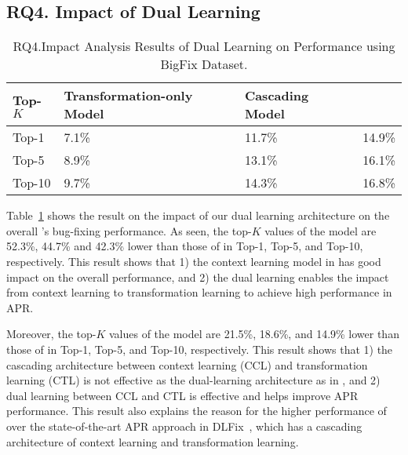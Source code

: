 \subsection{\bf RQ4. Impact of Dual Learning}



\begin{table}[t]
  \caption{RQ4.Impact Analysis Results of Dual Learning on Performance using BigFix Dataset.}
  \vspace{-6pt}
	{\small
		\begin{center}
			\renewcommand{\arraystretch}{1}
			\begin{tabular}{p{1cm}<{\centering}|p{2.7cm}<{\centering}|p{1.7cm}<{\centering}|p{1cm}<{\centering}}
				\hline
				Top-$K$ & Transformation-only Model & Cascading Model &  \tool \\			
				\hline
				Top-1   & 7.1\% & 11.7\% & 14.9\% \\ \hline
				Top-5	& 8.9\% & 13.1\% & 16.1\% \\ \hline
				Top-10	& 9.7\% & 14.3\% & 16.8\%\\ \hline
			
				\hline
			\end{tabular}
			\label{fig:rq4_results}
		\end{center}
	}
\end{table}

Table~\ref{fig:rq4_results} shows the result on the impact of our dual
learning architecture on the overall {\tool}'s bug-fixing performance.
As seen, the top-$K$ values of the  model
are 52.3\%, 44.7\% and 42.3\% lower than those of {\tool} in Top-1,
Top-5, and Top-10, respectively. This result shows that 1) the context
learning model in {\tool} has good impact on the overall performance,
and 2) the dual learning enables the impact from context learning to
transformation learning to achieve high performance in APR.

Moreover, the top-$K$ values of the  model are 21.5\%,
18.6\%, and 14.9\% lower than those of {\tool} in Top-1, Top-5, and
Top-10, respectively. This result shows that 1) the cascading
architecture between context learning (CCL) and transformation
learning (CTL) is not effective as the dual-learning architecture as
in {\tool}, and 2) dual learning between CCL and CTL is effective and
helps improve APR performance. This result also explains the reason
for the higher performance of {\tool} over the state-of-the-art APR
approach in DLFix~\cite{icse20}, which has a cascading architecture of
context learning and transformation learning.



